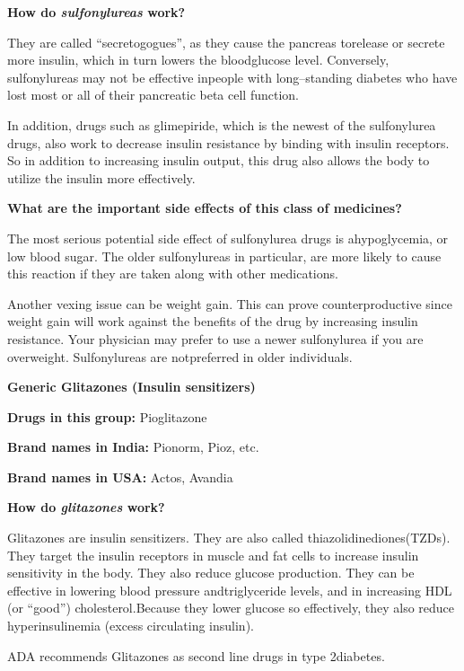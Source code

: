 \noindent\textbf{How do \textit{sulfonylureas} work?}

They are called “secretogogues”, as they cause the pancreas to\break release or secrete more insulin, which in turn lowers the blood\break glucose level. Conversely, sulfonylureas may not be effective in\break people with long–standing diabetes who have lost most or all of their pancreatic beta cell function.

In addition, drugs such as glimepiride, which is the newest of the sulfonylurea drugs, also work to decrease insulin resistance by binding with insulin receptors. So in addition to increasing insulin output, this drug also allows the body to utilize the insulin more effectively.

\noindent\textbf{What are the important side effects of this class of medicines?}

The most serious potential side effect of sulfonylurea drugs is a\break hypoglycemia, or low blood sugar. The older sulfonylureas in parti\-cular, are more likely to cause this reaction if they are taken along with other medications.

Another vexing issue can be weight gain. This can prove counterproductive since weight gain will work against the benefits of the drug by increasing insulin resistance. Your physician may prefer to use a newer sulfonylurea if you are overweight. Sulfonylureas are not\break preferred in older individuals.

\vskip 6pt

\textbf{Generic Glitazones (Insulin sensitizers)}

\textbf{Drugs in this group:} Pioglitazone

\textbf{Brand names in India:} Pionorm, Pioz, etc.

\textbf{Brand names in USA:} Actos, Avandia

\noindent\textbf{How do \textit{glitazones} work?}

Glitazones are insulin sensitizers. They are also called thiazolidinediones(TZDs). They target the insulin receptors in muscle and fat cells to increase insulin sensitivity in the body. They also reduce glucose production. They can be effective in lowering blood pressure and\break triglyceride levels, and in increasing HDL (or “good”) cholesterol.\break Because they lower glucose so effectively, they also reduce hyper\-insu\-linemia (excess circulating insulin).

ADA recommends Glitazones as second line drugs in type 2\break diabetes.

